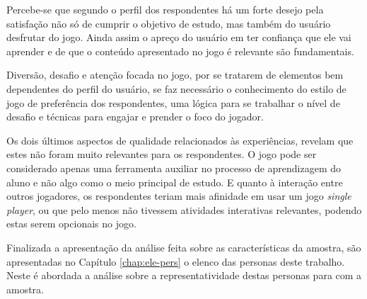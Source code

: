 Percebe-se que segundo o perfil dos respondentes há um forte desejo pela satisfação não só de cumprir o objetivo de estudo, mas também do usuário desfrutar do jogo. Ainda assim o apreço do usuário em ter confiança que ele vai aprender e de que o conteúdo apresentado no jogo é relevante são fundamentais.

Diversão, desafio e atenção focada no jogo, por se tratarem de elementos bem dependentes do perfil do usuário, se faz necessário o conhecimento do estilo de jogo de preferência dos respondentes, uma lógica para se trabalhar o nível de desafio e técnicas para engajar e prender o foco do jogador.

Os dois últimos aspectos de qualidade relacionados às experiências, revelam que estes não foram muito relevantes para os respondentes. O jogo pode ser considerado apenas uma ferramenta auxiliar no processo de aprendizagem do aluno e não algo como o meio principal de estudo. E quanto à interação entre outros jogadores, os respondentes teriam mais afinidade em usar um jogo \textit{single player}, ou que pelo menos não tivessem atividades interativas relevantes, podendo estas serem opcionais no jogo.

Finalizada a apresentação da análise feita sobre as características da amostra, são apresentadas no Capítulo \ref{chap:ele-pers} o elenco das personas deste trabalho. Neste é abordada a análise sobre a representatividade destas personas para com a amostra.





